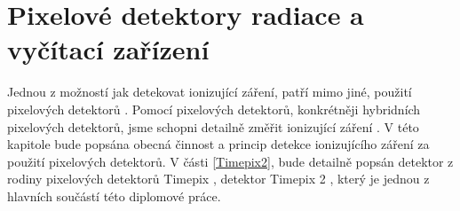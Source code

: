 \chapter{Pixelové detektory radiace a vyčítací zařízení}	%
\label{kap:2}
Jednou z možností jak detekovat ionizující záření, patří mimo jiné, použití pixelových detektorů \cite{Grupen_Shwartz_2008}. Pomocí pixelových detektorů, konkrétněji hybridních pixelových detektorů, jsme schopni detailně změřit ionizující záření \cite{Rossi2006}. V této kapitole bude popsána obecná činnost a princip detekce ionizujícího záření za použití pixelových detektorů. V části \ref{Timepix2}, bude detailně popsán detektor z rodiny pixelových detektorů Timepix \cite{Llopart}, detektor Timepix 2 \cite{tpx2_manual}, který je jednou z hlavních součástí této diplomové práce.

